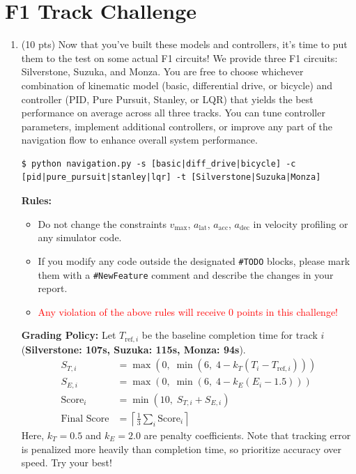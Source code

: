 \documentclass[11pt]{article}
\begin{document}
\section{F1 Track Challenge}
\begin{enumerate}
    \item \textbf{\faPython} (10 pts) Now that you've built these models and controllers, it's time to put them to the test on some actual F1 circuits! 
          We provide three F1 circuits: Silverstone, Suzuka, and Monza. You are free to choose whichever combination of kinematic model (basic, differential drive, or bicycle) and controller (PID, Pure Pursuit, Stanley, or LQR) that yields the best performance on average across all three tracks.
          You can tune controller parameters, implement additional controllers, or improve any part of the navigation flow to enhance overall system performance.

          \begin{lstlisting}[backgroundcolor=\color{gray!15}, frame=single, framerule=0pt, framesep=5pt, xleftmargin=5pt, xrightmargin=5pt]
$ python navigation.py -s [basic|diff_drive|bicycle] -c [pid|pure_pursuit|stanley|lqr] -t [Silverstone|Suzuka|Monza]
          \end{lstlisting}
          \textbf{Rules: }
          \begin{itemize}
            \item Do not change the constraints $v_\mathrm{max}$, $a_\mathrm{lat}$, $a_\mathrm{acc}$, $a_\mathrm{dec}$ in velocity profiling or any simulator code.
            \item If you modify any code outside the designated \texttt{\#TODO} blocks, please mark them with a \texttt{\#NewFeature} comment and describe the changes in your report.
            \item \textcolor{red}{Any violation of the above rules will receive 0 points in this challenge!}
          \end{itemize}



          \textbf{Grading Policy:} 
          Let $T_{\mathrm{ref},i}$ be the baseline completion time for track $i$ (\textbf{Silverstone: 107s, Suzuka: 115s, Monza: 94s}).
          \begin{align*}
              S_{T,i} &= \max \left( 0,\; \min \left( 6,\; 4 - k_T (T_i - T_{\mathrm{ref},i}) \right) \right) \\
              S_{E,i} &= \max \left( 0,\; \min \left( 6,\; 4 - k_E (E_i - 1.5) \right) \right) \\
              \text{Score}_i &= \min \left( 10,\; S_{T,i} + S_{E,i} \right) \\
              \text{Final Score} &= \left\lceil \frac{1}{3} \sum_{i} \text{Score}_i \right\rceil
          \end{align*}
          Here, $k_T = 0.5$ and $k_E = 2.0$ are penalty coefficients. Note that tracking error is penalized more heavily than completion time, so prioritize accuracy over speed. Try your best!
          

\end{enumerate}
\end{document}
